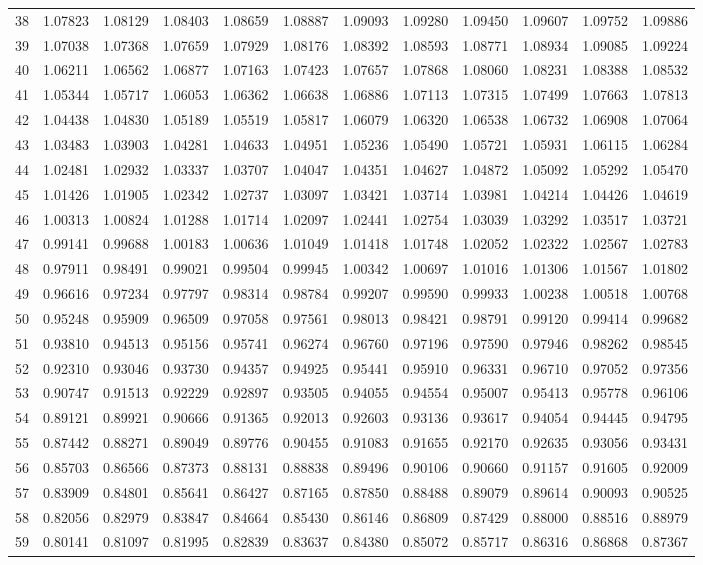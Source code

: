 \begin{center}
\begin{tabular}{|r|rrrrrrrrrrr|}
38&1.07823&1.08129&1.08403&1.08659&1.08887&1.09093&1.09280&1.09450&1.09607&1.09752&1.09886\\
39&1.07038&1.07368&1.07659&1.07929&1.08176&1.08392&1.08593&1.08771&1.08934&1.09085&1.09224\\[5pt]
40&1.06211&1.06562&1.06877&1.07163&1.07423&1.07657&1.07868&1.08060&1.08231&1.08388&1.08532\\
41&1.05344&1.05717&1.06053&1.06362&1.06638&1.06886&1.07113&1.07315&1.07499&1.07663&1.07813\\
42&1.04438&1.04830&1.05189&1.05519&1.05817&1.06079&1.06320&1.06538&1.06732&1.06908&1.07064\\
43&1.03483&1.03903&1.04281&1.04633&1.04951&1.05236&1.05490&1.05721&1.05931&1.06115&1.06284\\
44&1.02481&1.02932&1.03337&1.03707&1.04047&1.04351&1.04627&1.04872&1.05092&1.05292&1.05470\\[5pt]
45&1.01426&1.01905&1.02342&1.02737&1.03097&1.03421&1.03714&1.03981&1.04214&1.04426&1.04619\\
46&1.00313&1.00824&1.01288&1.01714&1.02097&1.02441&1.02754&1.03039&1.03292&1.03517&1.03721\\
47&0.99141&0.99688&1.00183&1.00636&1.01049&1.01418&1.01748&1.02052&1.02322&1.02567&1.02783\\
48&0.97911&0.98491&0.99021&0.99504&0.99945&1.00342&1.00697&1.01016&1.01306&1.01567&1.01802\\
49&0.96616&0.97234&0.97797&0.98314&0.98784&0.99207&0.99590&0.99933&1.00238&1.00518&1.00768\\[5pt]
50&0.95248&0.95909&0.96509&0.97058&0.97561&0.98013&0.98421&0.98791&0.99120&0.99414&0.99682\\
51&0.93810&0.94513&0.95156&0.95741&0.96274&0.96760&0.97196&0.97590&0.97946&0.98262&0.98545\\
52&0.92310&0.93046&0.93730&0.94357&0.94925&0.95441&0.95910&0.96331&0.96710&0.97052&0.97356\\
53&0.90747&0.91513&0.92229&0.92897&0.93505&0.94055&0.94554&0.95007&0.95413&0.95778&0.96106\\
54&0.89121&0.89921&0.90666&0.91365&0.92013&0.92603&0.93136&0.93617&0.94054&0.94445&0.94795\\[5pt]
55&0.87442&0.88271&0.89049&0.89776&0.90455&0.91083&0.91655&0.92170&0.92635&0.93056&0.93431\\
56&0.85703&0.86566&0.87373&0.88131&0.88838&0.89496&0.90106&0.90660&0.91157&0.91605&0.92009\\
57&0.83909&0.84801&0.85641&0.86427&0.87165&0.87850&0.88488&0.89079&0.89614&0.90093&0.90525\\
58&0.82056&0.82979&0.83847&0.84664&0.85430&0.86146&0.86809&0.87429&0.88000&0.88516&0.88979\\
59&0.80141&0.81097&0.81995&0.82839&0.83637&0.84380&0.85072&0.85717&0.86316&0.86868&0.87367\\
\hline\end{tabular}
\end{center}
